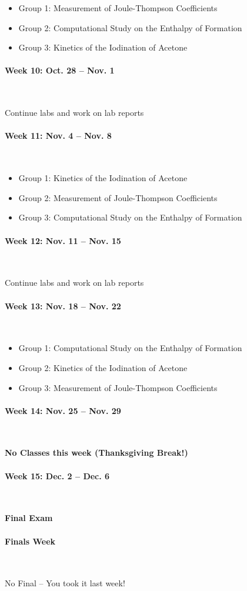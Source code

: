 \documentclass[12pt, letterpaper]{article}
\begin{document}
\begin{itemize}
  \item Group 1: Measurement of Joule-Thompson Coefficients
  \item Group 2: Computational Study on the Enthalpy of Formation
  \item Group 3: Kinetics of the Iodination of Acetone
\end{itemize}

\paragraph{Week 10: Oct. 28 -- Nov. 1}~

Continue labs and work on lab reports

\paragraph{Week 11: Nov. 4 -- Nov. 8}~

\begin{itemize}
  \item Group 1: Kinetics of the Iodination of Acetone
  \item Group 2: Measurement of Joule-Thompson Coefficients
  \item Group 3: Computational Study on the Enthalpy of Formation
\end{itemize}

\paragraph{Week 12: Nov. 11 -- Nov. 15}~

Continue labs and work on lab reports

\paragraph{Week 13: Nov. 18 -- Nov. 22}~

\begin{itemize}
  \item Group 1: Computational Study on the Enthalpy of Formation
  \item Group 2: Kinetics of the Iodination of Acetone
  \item Group 3: Measurement of Joule-Thompson Coefficients
\end{itemize}

\paragraph{Week 14: Nov. 25 -- Nov. 29}~

\textbf{No Classes this week (Thanksgiving Break!)}


\paragraph{Week 15: Dec. 2 -- Dec. 6}~

\textbf{Final Exam}

\paragraph{Finals Week}~

No Final -- You took it last week!
\end{document}

